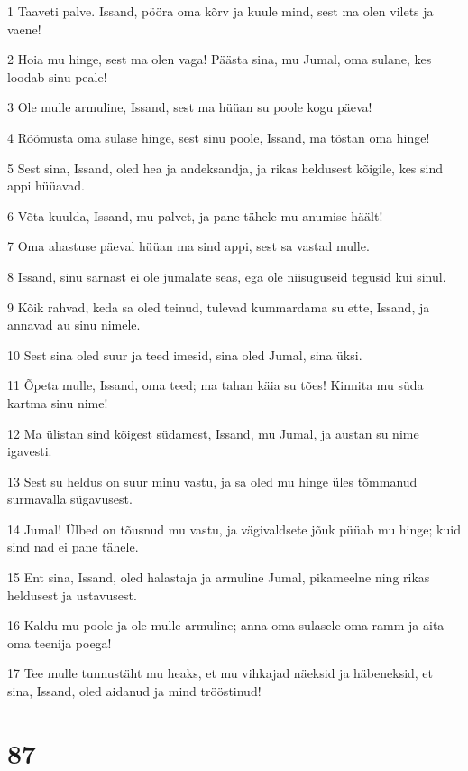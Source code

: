 \par 1 Taaveti palve. Issand, pööra oma kõrv ja kuule mind, sest ma olen vilets ja vaene!
\par 2 Hoia mu hinge, sest ma olen vaga! Päästa sina, mu Jumal, oma sulane, kes loodab sinu peale!
\par 3 Ole mulle armuline, Issand, sest ma hüüan su poole kogu päeva!
\par 4 Rõõmusta oma sulase hinge, sest sinu poole, Issand, ma tõstan oma hinge!
\par 5 Sest sina, Issand, oled hea ja andeksandja, ja rikas heldusest kõigile, kes sind appi hüüavad.
\par 6 Võta kuulda, Issand, mu palvet, ja pane tähele mu anumise häält!
\par 7 Oma ahastuse päeval hüüan ma sind appi, sest sa vastad mulle.
\par 8 Issand, sinu sarnast ei ole jumalate seas, ega ole niisuguseid tegusid kui sinul.
\par 9 Kõik rahvad, keda sa oled teinud, tulevad kummardama su ette, Issand, ja annavad au sinu nimele.
\par 10 Sest sina oled suur ja teed imesid, sina oled Jumal, sina üksi.
\par 11 Õpeta mulle, Issand, oma teed; ma tahan käia su tões! Kinnita mu süda kartma sinu nime!
\par 12 Ma ülistan sind kõigest südamest, Issand, mu Jumal, ja austan su nime igavesti.
\par 13 Sest su heldus on suur minu vastu, ja sa oled mu hinge üles tõmmanud surmavalla sügavusest.
\par 14 Jumal! Ülbed on tõusnud mu vastu, ja vägivaldsete jõuk püüab mu hinge; kuid sind nad ei pane tähele.
\par 15 Ent sina, Issand, oled halastaja ja armuline Jumal, pikameelne ning rikas heldusest ja ustavusest.
\par 16 Kaldu mu poole ja ole mulle armuline; anna oma sulasele oma ramm ja aita oma teenija poega!
\par 17 Tee mulle tunnustäht mu heaks, et mu vihkajad näeksid ja häbeneksid, et sina, Issand, oled aidanud ja mind trööstinud!

\chapter{87}


